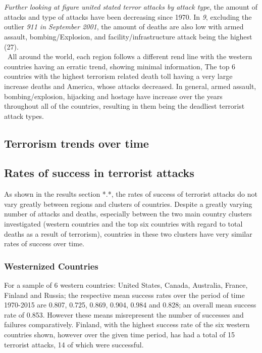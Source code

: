 \documentclass[10pt,a4paper]{article}
\begin{document}
\\\\
\textit{Further looking at figure united stated terror attacks by attack type}, the amount of attacks and type of attacks have been decreasing since 1970. In \textit{9}, excluding the outlier \textit{911 in September 2001}, the amount of deaths are also low with armed assault, bombing/Explosion, and facility/infrastructure attack being the highest (27).
\\\
All around the world, each region follows a different rend line with the western countries having an erratic trend, showing minimal information, The top 6 countries with the highest terrorism related death toll having a very large increase deaths and America, whose attacks decreased. In general, armed assault, bombing/explosion, hijacking and hostage have increase over the years throughout all of the countries, resulting in them being the deadliest terrorist attack types.



\subsection{Terrorism trends over time}

\subsection{Rates of success in terrorist attacks}
As shown in the results section *.*, the rates of success of terrorist attacks do not vary greatly between regions and clusters of countries. Despite a greatly varying number of attacks and deaths, especially between the two main country clusters investigated (western countries and the top six countries with regard to total deaths as a result of terrorism), countries in these two clusters have very similar rates of success over time. 


\subsubsection{Westernized Countries}
For a sample of 6 western countries: United States, Canada, Australia, France, Finland and Russia; the respective mean success rates over the period of time 1970-2015 are 0.807, 0.725, 0.869, 0.904, 0.984 and 0.828; an overall mean success rate of 0.853. However these means misrepresent the number of successes and failures comparatively. Finland, with the highest success rate of the six western countries shown, however over the given time period, has had a total of 15 terrorist attacks, 14 of which were successful. 
\end{document}
